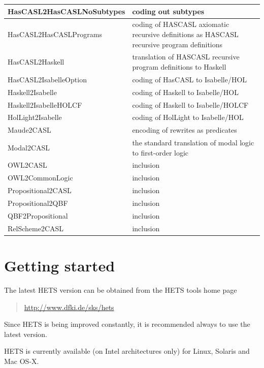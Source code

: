 \documentclass{article}
\newcommand{\normalTEXTSC}[2]{{#1\scriptsize#2}}
\newcommand     {\Hets}{\normalTEXTSC{H}{ETS}\xspace}
\newcommand     {\HasCASL}{\normalTEXTSC{H}{AS}\normalTEXTSC{C}{ASL}\xspace}
\begin{document}
\begin{tabular}{|l|p{7cm}|}\hline
HasCASL2HasCASLNoSubtypes & coding out subtypes \\\hline
HasCASL2HasCASLPrograms & coding of \HasCASL axiomatic recursive definitions
as \HasCASL recursive program definitions \\\hline
HasCASL2Haskell & translation of \HasCASL recursive program definitions to Haskell \\\hline
HasCASL2IsabelleOption & coding of HasCASL to Isabelle/HOL \cite{Groening05} \\\hline
Haskell2Isabelle & coding of Haskell to Isabelle/HOL \cite{TorriniEtAl07} \\\hline
Haskell2IsabelleHOLCF & coding of Haskell to Isabelle/HOLCF \cite{TorriniEtAl07} \\\hline
HolLight2Isabelle & coding of HolLight to Isabelle/HOL \\\hline
Maude2CASL & encoding of rewrites as predicates \\\hline
Modal2CASL & the standard translation of modal logic
to first-order logic \cite{blackburn_p-etal:2001a} \\\hline
OWL2CASL & inclusion \\\hline
OWL2CommonLogic & inclusion \\\hline
Propositional2CASL & inclusion \\\hline
Propositional2QBF & inclusion \\\hline
QBF2Propositional & inclusion \\\hline
RelScheme2CASL & inclusion \\\hline
\end{tabular}

\section{Getting started}

The latest \Hets version can be obtained from the
\Hets tools home page
\begin{quote}
\url{http://www.dfki.de/sks/hets}
\end{quote}
 Since \Hets is being
improved constantly, it is recommended always to use the latest version.

\Hets is currently available (on Intel architectures only) for Linux, Solaris
and Mac OS-X.
\end{document}
